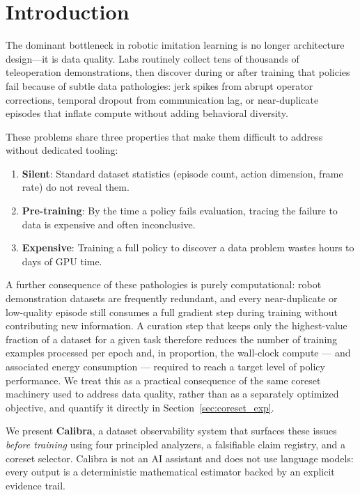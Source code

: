 \documentclass[10pt,twocolumn]{article}
\begin{document}
\section{Introduction}
\label{sec:intro}

The dominant bottleneck in robotic imitation learning is no longer architecture
design---it is data quality.
Labs routinely collect tens of thousands of teleoperation demonstrations, then
discover during or after training that policies fail because of subtle data
pathologies: jerk spikes from abrupt operator corrections, temporal dropout from
communication lag, or near-duplicate episodes that inflate compute without
adding behavioral diversity.

These problems share three properties that make them difficult to address
without dedicated tooling:
\begin{enumerate}[leftmargin=*,nosep]
  \item \textbf{Silent}: Standard dataset statistics (episode count, action
    dimension, frame rate) do not reveal them.
  \item \textbf{Pre-training}: By the time a policy fails evaluation, tracing
    the failure to data is expensive and often inconclusive.
  \item \textbf{Expensive}: Training a full policy to discover a data problem
    wastes hours to days of GPU time.
\end{enumerate}

A further consequence of these pathologies is purely computational: robot
demonstration datasets are frequently redundant, and every near-duplicate or
low-quality episode still consumes a full gradient step during training
without contributing new information. A curation step that keeps only the
highest-value fraction of a dataset for a given task therefore reduces the
number of training examples processed per epoch and, in proportion, the
wall-clock compute --- and associated energy consumption --- required to
reach a target level of policy performance. We treat this as a practical
consequence of the same coreset machinery used to address data quality,
rather than as a separately optimized objective, and quantify it directly in
Section~\ref{sec:coreset_exp}.

We present \textbf{Calibra}, a dataset observability system that surfaces
these issues \emph{before training} using four principled analyzers, a
falsifiable claim registry, and a coreset selector. Calibra is not an AI
assistant and does not use language models: every output is a deterministic
mathematical estimator backed by an explicit evidence trail.
\end{document}
